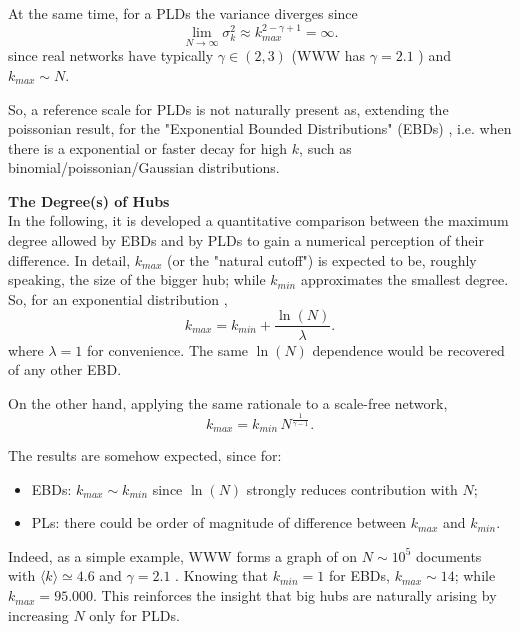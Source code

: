 \documentclass[a4paper,12pt,twoside]{book} %
\theoremstyle{definition}
\begin{document}
At the same time, for a PLDs the variance diverges since \cite{barabasi::2016networkbook}	
\begin{equation}
	\lim_{N \to \infty} \sigma_k^2 \approx k_{max}^{2-\gamma+1} = \infty.
	\label{eq:kn_SFnets}
\end{equation}
since real networks have typically $\gamma \in (2,3)$ (WWW has $\gamma =  2.1$ \cite{barabasi::2016networkbook}) and $k_{max} \sim N$. 

So, a reference scale for PLDs is not naturally present as, extending the poissonian result, for the "Exponential Bounded Distributions" (EBDs) \cite{barabasi::2016networkbook}, i.e. when there is a exponential or faster decay for high $k$, such as binomial/poissonian/Gaussian distributions.

{\large \textbf{The Degree(s) of Hubs}} \\
In the following, it is developed a quantitative comparison between the maximum degree allowed by EBDs and by PLDs to gain a numerical perception of their difference.
In detail, $k_{max}$ (or the "natural cutoff") is expected to be, roughly speaking, the size of the bigger hub; while $k_{min}$ approximates the smallest degree.
So, for an exponential distribution \cite{barabasi::2016networkbook}, 
\begin{equation}
	k_{max} = k_{min} + \frac{\ln(N)}{\lambda}.
	\label{eq:Expkmax_up}	
\end{equation}
where $\lambda = 1$ for convenience. The same $\ln(N)$ dependence would be recovered of any other EBD.

On the other hand, applying the same rationale to a scale-free network, 
\begin{equation}
	k_{max} = k_{min}\,N^{\frac{1}{\gamma-1}}.
	\label{eq:SFkmax_up}
\end{equation}

The results are somehow expected, since for:
\begin{itemize}
	\item EBDs: $k_{max} \sim k_{min}$ since $\ln(N)$ strongly reduces contribution with $N$;
	\item PLs: there could be order of magnitude of difference between $k_{max}$ and $k_{min}$.
\end{itemize} 
Indeed, as a simple example, WWW forms a graph of on $N \sim 10^5$ documents with $\langle k \rangle \simeq 4.6$ and $\gamma = 2.1$ \cite{barabasi::2016networkbook}. 
Knowing that $k_{min} = 1$ for EBDs, $k_{max} \sim 14$; while $k_{max} = 95.000$. 
This reinforces the insight that big hubs are naturally arising by increasing $N$ only for PLDs.
\label{sec:SFProperties_up}
\end{document}
